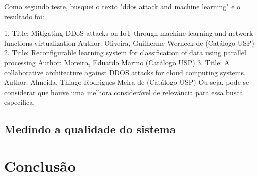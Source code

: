 \documentclass[
	12pt,				%
	openright,			%
	oneside,			%
	a4paper,			%
	english,			%
	french,				%
	spanish,			%
	brazil				%
	]{abntex2}
\begin{document}
Como segundo teste, busquei o texto "ddos attack and machine learning" e o resultado foi:

1. Title:  Mitigating DDoS attacks on IoT through machine learning and network functions virtualization
Author:  Oliveira, Guilherme Werneck de (Catálogo USP)
2. Title:  Reconfigurable learning system for classification of data using parallel processing
Author:  Moreira, Eduardo Marmo (Catálogo USP)
3. Title:  A collaborative architecture against DDOS attacks for cloud computing systems.
Author:  Almeida, Thiago Rodrigues Meira de (Catálogo USP)
Ou seja, pode-se considerar que houve uma melhora considerável de relevância para essa busca específica.




\section{Medindo a qualidade do sistema}

\chapter*[Conclusão]{Conclusão}


\postextual

%
%

\end{document}
